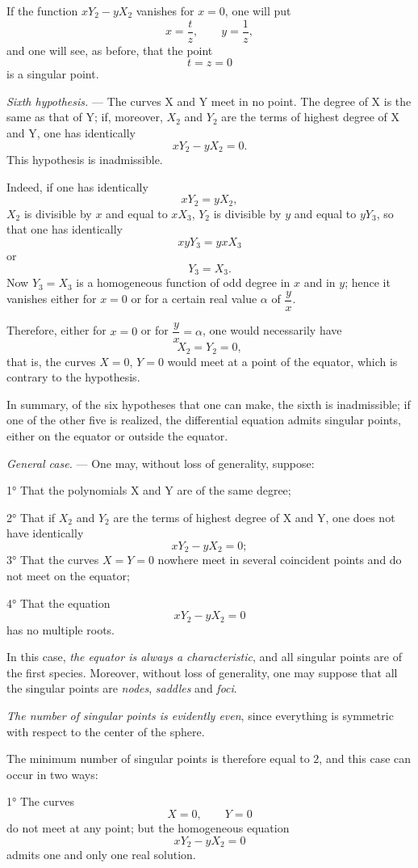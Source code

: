 \documentclass[11pt]{article}
\begin{document}
If the function $xY_2-yX_2$ vanishes for $x=0$, one will put
\[
x=\frac{t}{z},\qquad y=\frac1z,
\]
and one will see, as before, that the point
\[
t=z=0
\]
is a singular point.

\emph{Sixth hypothesis.} --- The curves X and Y meet in no point. The degree of X is the same as that of Y; if, moreover, $X_2$ and $Y_2$ are the terms of highest degree of X and Y, one has identically
\[
xY_2-yX_2=0.
\]
This hypothesis is inadmissible.

Indeed, if one has identically
\[
xY_2=yX_2,
\]
$X_2$ is divisible by $x$ and equal to $xX_3$, $Y_2$ is divisible by $y$ and equal to $yY_3$, so that one has identically
\[
xyY_3=yxX_3
\]
or
\[
Y_3=X_3.
\]
Now $Y_3=X_3$ is a homogeneous function of odd degree in $x$ and in $y$; hence it vanishes either for $x=0$ or for a certain real value $\alpha$ of $\dfrac yx$.

Therefore, either for $x=0$ or for $\dfrac yx=\alpha$, one would necessarily have
\[
X_2=Y_2=0,
\]
that is, the curves $X=0$, $Y=0$ would meet at a point of the equator, which is contrary to the hypothesis.

In summary, of the six hypotheses that one can make, the sixth is inadmissible; if one of the other five is realized, the differential equation admits singular points, either on the equator or outside the equator.

\emph{General case.} --- One may, without loss of generality, suppose:

1° That the polynomials X and Y are of the same degree;

2° That if $X_2$ and $Y_2$ are the terms of highest degree of X and Y, one does not have identically
\[
xY_2-yX_2=0;
\]
3° That the curves $X=Y=0$ nowhere meet in several coincident points and do not meet on the equator;

4° That the equation
\[
xY_2-yX_2=0
\]
has no multiple roots.

In this case, \emph{the equator is always a characteristic}, and all singular points are of the first species. Moreover, without loss of generality, one may suppose that all the singular points are \emph{nodes}, \emph{saddles} and \emph{foci}.

\emph{The number of singular points is evidently even}, since everything is symmetric with respect to the center of the sphere.

The minimum number of singular points is therefore equal to $2$, and this case can occur in two ways:

1° The curves
\[
X=0,\qquad Y=0
\]
do not meet at any point; but the homogeneous equation
\[
xY_2-yX_2=0
\]
admits one and only one real solution.
\end{document}
